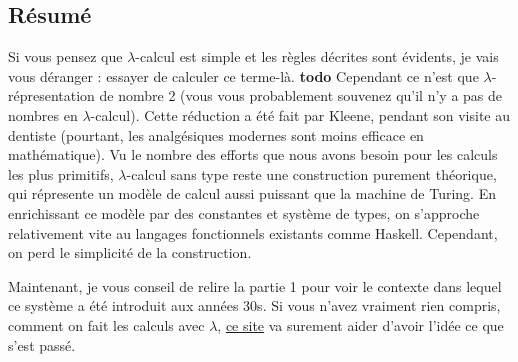 \documentclass[12pt, a4paper]{article}
\begin{document}
\subsection*{Résumé}
Si vous pensez que $\lambda$-calcul est simple et les règles décrites sont évidents, je vais vous déranger : essayer de calculer ce terme-là.
\textbf{todo}
Cependant ce n'est que $\lambda$-répresentation de nombre 2 (vous vous probablement souvenez qu'il n'y a pas de nombres en $\lambda$-calcul).
Cette réduction a été fait par Kleene, pendant son visite au dentiste (pourtant, les analgésiques modernes sont moins efficace en mathématique).
Vu le nombre des efforts que nous avons besoin pour les calculs les plus primitifs, $\lambda$-calcul sans type reste une construction purement théorique, qui répresente un modèle de calcul aussi puissant que la machine de Turing.
En enrichissant ce modèle par des constantes et système de types, on s'approche relativement vite au langages fonctionnels existants comme Haskell.
Cependant, on perd le simplicité de la construction.

Maintenant, je vous conseil de relire la partie 1 pour voir le contexte dans lequel ce système a été introduit aux années 30s.
Si vous n'avez vraiment rien compris, comment on fait les calculs avec $\lambda$, \href{http://worrydream.com/AlligatorEggs/}{ce site} va surement aider d'avoir l'idée ce que s'est passé.
\end{document}

